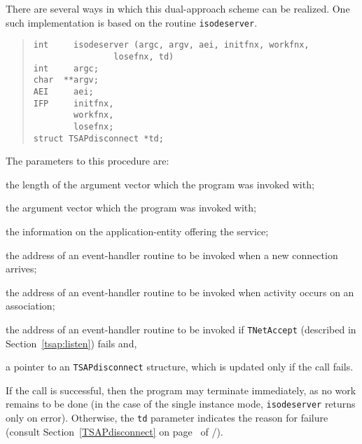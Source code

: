 There are several ways in which this dual-approach scheme can be realized.
One such implementation is based on the routine
\verb"isodeserver".\label{isodeserver}
\begin{quote}\small\begin{verbatim}
int     isodeserver (argc, argv, aei, initfnx, workfnx,
                losefnx, td)
int     argc;
char  **argv;
AEI     aei;
IFP     initfnx,
        workfnx,
        losefnx;
struct TSAPdisconnect *td;
\end{verbatim}\end{quote}
The parameters to this procedure are:
\begin{describe}
\item[\verb"argc":] the length of the argument vector which the program was
invoked with;

\item[\verb"argv":] the argument vector which the program was invoked with;

\item[\verb"aei":] the information on the application-entity offering the
service;

\item[\verb"initfnx":] the address of an event-handler routine to be invoked
when a new connection arrives;

\item[\verb"workfnx":] the address of an event-handler routine to be invoked
when activity occurs on an association;

\item[\verb"losefnx":] the address of an event-handler routine to be invoked
if \verb"TNetAccept" (described in Section~\ref{tsap:listen}) fails 
and,

\item[\verb"td":] a pointer to an \verb"TSAPdisconnect" structure,
which is updated only if the call fails.
\end{describe}
If the call is successful,
then the program may terminate immediately,
as no work remains to be done
(in the case of the single instance mode,
\verb"isodeserver" returns only on error).
Otherwise,
the \verb"td" parameter indicates the reason for failure
(consult Section~\ref{TSAPdisconnect} on page~\pageref{TSAPdisconnect}
of \voltwo/).

